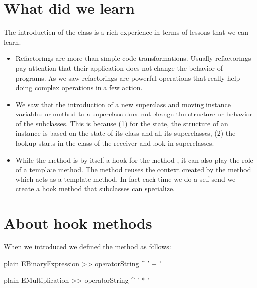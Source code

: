 \documentclass[10pt,twoside,english]{_support/latex/sbabook/sbabook}
\begin{document}
\section{What did we learn}
The introduction of the class  is a rich experience in terms of lessons that we can learn. 

\begin{itemize}
\item Refactorings are more than simple code transformations. Usually refactorings pay attention that their application does not change the behavior of programs. As we saw refactorings are powerful operations that really help doing complex operations in a few action.
\end{itemize}

\begin{itemize}
\item We saw that the introduction of a new superclass and moving instance variables or method to a superclass does not change the structure or behavior of the subclasses. This is because (1) for the state, the structure of an instance is based on the state of its class and all its superclasses, (2) the lookup starts in the class of the receiver and look in superclasses.
\end{itemize}

\begin{itemize}
\item While the method  is by itself a hook for the method , it can also play the role of a template method. The method  reuses the context created by the  method which acts as a template method. In fact each time we do a self send we create a hook method that subclasses can specialize.
\end{itemize}
\section{About hook methods}
When we introduced  we defined the method  as follows:

\begin{displaycode}{plain}
EBinaryExpression >> operatorString
	^ ' + '
\end{displaycode}

\begin{displaycode}{plain}
EMultiplication >> operatorString
	^ ' * '
\end{displaycode}
\end{document}

